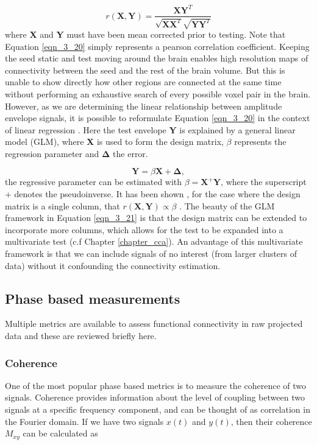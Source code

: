 \begin{equation}
r(\mathbf{X},\mathbf{Y}) = \frac{\mathbf{XY}^T}{\sqrt{\mathbf{XX}^T}\sqrt{\mathbf{YY}^T}}\label{eqn_3_20}
\end{equation} where \textbf{X} and \textbf{Y} must have been mean corrected prior to testing. Note that Equation \ref{eqn_3_20} simply represents a pearson correlation coefficient. Keeping the seed static and test moving around the brain enables high resolution maps of connectivity between the seed and the rest of the brain volume. But this is unable to show directly how other regions are connected at the same time without performing an exhaustive search of every possible voxel pair in the brain. However, as we are determining the linear relationship between amplitude envelope signals, it is possible to reformulate Equation \ref{eqn_3_20} in the context of linear regression \citep{Hall2013}. Here the test envelope \textbf{Y} is explained by a general linear model (GLM), where \textbf{X} is used to form the design matrix, $\beta$ represents the regression parameter and $\mathbf{\Delta}$ the error.

\begin{equation}
\mathbf{Y} = \beta\mathbf{X} + \mathbf{\Delta}, \label{eqn_3_21}
\end{equation} the regressive parameter can be estimated with $\beta=\textbf{X}^+\textbf{Y}$, where the superscript + denotes the pseudoinverse. It has been shown , for the case where the design matrix is a single column, that $r(\mathbf{X},\mathbf{Y}) \propto \beta$ \citep{Hall2013}. The beauty of the GLM framework in Equation \ref{eqn_3_21} is that the design matrix can be extended to incorporate more columns, which allows for the test to be expanded into a multivariate test (c.f Chapter \ref{chapter_cca}). An advantage of this multivariate framework is that we can include signals of no interest (from larger clusters of data) without it confounding the connectivity estimation.

\subsection{Phase based measurements}
Multiple metrics are available to assess functional connectivity in raw projected data and these are reviewed briefly here.

\subsubsection{Coherence}
One of the most popular phase based metrics is to measure the coherence of two signals. Coherence provides information about the level of coupling between two signals at a specific frequency component, and can be thought of as correlation in the Fourier domain. If we have two signals $x(t)$ and $y(t)$, then their coherence $M_{xy}$ can be calculated as

